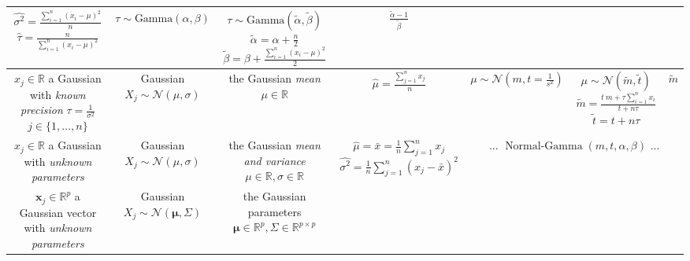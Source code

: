 \documentclass[10pt,landscape]{article}
\newcommand{\R}{\mathbb{R}}
\newcommand{\N}{\mathcal{N}}
\newcommand{\Gam}{\textrm{Gamma}}
\begin{document}
\begin{center}
\begin{tabular}{ccccccc}
  \shortstack{$\hat{\sigma^2}=\frac{\sum_{i=1}^{n}(x_{i}-\mu )^2}{n}$ \\
              $\hat{\tau}=\frac{n}{\sum_{i=1}^{n}(x_{i}-\mu )^2}$} &
  $\tau\sim \Gam(\alpha,\beta)$ & \shortstack{
  $\tau\sim \Gam(\tilde{\alpha},\tilde{\beta})$\\
  $ \tilde{\alpha} = \alpha +{\frac {n}{2}}$ \\
  $\tilde{\beta}=\beta +{\frac {\sum _{i=1}^{n}(x_{i}-\mu )^{2}}{2}}$} &
  $\frac{\tilde{\alpha}-1}{\tilde{\beta}}$
  \\\hline
  \shortstack{$x_j\in \mathbb{R}$ \\ a Gaussian with \emph{known precision} $\tau=\frac{1}{\sigma^2}$\\$j\in\{1,\dots,n\}$}&
  \shortstack{Gaussian \\ $X_j\sim\N(\mu, \sigma)$} &
  \shortstack{the Gaussian \emph{mean} \\ $\mu\in\R$} &
  $\hat{\mu}=\frac{\sum_{j=1}^n x_j}{n}$ &
  $\mu\sim \N(m, t=\frac{1}{s^2})$ & \shortstack{
    $\mu\sim \N(\tilde{m}, \tilde{t} )$\\
    $ \tilde{m} = \frac {t\:m+\tau \sum _{i=1}^{n}x_{i}}{t+n\tau }$ \\
    $\tilde{t}=t+n\tau$} &
  $\tilde{m}$
  \\\hline
  \shortstack{$x_j\in \mathbb{R}$ \\ a Gaussian with \emph{unknown parameters}}&
  \shortstack{Gaussian \\ $X_j\sim\N(\mu, \sigma)$} &
  \shortstack{the Gaussian \\\emph{mean and variance} \\ $\mu\in\R,\sigma\in\R$} &
  \shortstack{$\hat{\mu}=\bar{x}=\frac{1}{n}\sum_{j=1}^n x_j$ \\ $\hat{\sigma^2}=\frac{1}{n}\sum_{j=1}^n (x_j-\bar{x})^2$} &
  \multicolumn{3}{c}{... \href{https://en.wikipedia.org/wiki/Normal\_distribution\#Bayesian\_analysis\_of\_the\_normal\_distribution}{$\operatorname{Normal-Gamma}(m,t,\alpha,\beta)$} ...}
  \\\hline\hline
  \shortstack{$\mathbf{x}_j\in \mathbb{R}^p$ \\ a Gaussian vector\\ with \emph{unknown parameters}}&
  \shortstack{Gaussian \\ $X_j\sim\N(\mathbf{\mu}, \Sigma)$} &
  \shortstack{the Gaussian parameters \\ $\mathbf{\mu}\in\R^p,\Sigma\in\R^{p\times p}$} &

\end{tabular}
\end{center}
\end{document}

